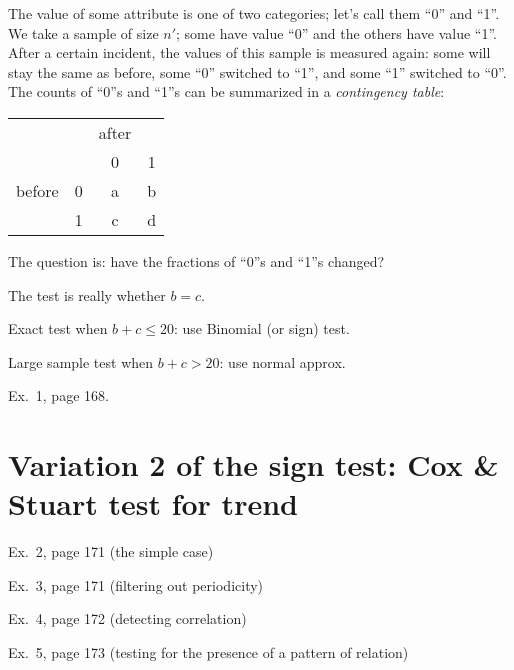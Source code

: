 \documentclass[12pt]{article}
\begin{document}
The value of some attribute is one of two categories; let's call them
``0'' and ``1''.
We take a sample of size $n'$; some have value ``0'' and the others have
value ``1''.
After a certain incident,
the values of this sample is measured again: some will stay the same as
before, some ``0'' switched to ``1'', and some ``1'' switched to ``0''.
The counts of ``0''s and ``1''s can be summarized in a \emph{contingency table}:

\begin{center}
\begin{tabular}{cc|cc}
    &   & after & \\
    & & 0   & 1 \\ \hline
before & 0 & a & b \\
    & 1 & c &d \\ \hline
\end{tabular}
\end{center}

The question is: have the fractions of ``0''s and ``1''s changed?

The test is really whether $b = c$.

Exact test when $b + c \le 20$: use Binomial (or sign) test.

Large sample test when $b + c > 20$: use normal approx.

\example Ex.~1, page 168.

\section{Variation 2 of the sign test: Cox \& Stuart test for trend}

\example Ex.~2, page 171 (the simple case)

\example Ex.~3, page 171 (filtering out periodicity)

\example Ex.~4, page 172 (detecting correlation)

\example Ex.~5, page 173 (testing for the presence of a pattern of
relation)
\end{document}
